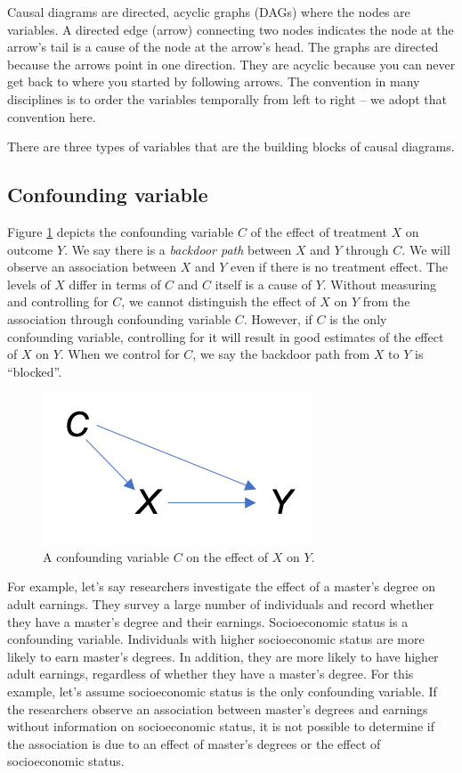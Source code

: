 \documentclass[
]{book}
\begin{document}
Causal diagrams are directed, acyclic graphs (DAGs) where the nodes are variables. A directed edge (arrow) connecting two nodes indicates the node at the arrow's tail is a cause of the node at the arrow's head. The graphs are directed because the arrows point in one direction. They are acyclic because you can never get back to where you started by following arrows. The convention in many disciplines is to order the variables temporally from left to right -- we adopt that convention here.

There are three types of variables that are the building blocks of causal diagrams.

\hypertarget{confounding-variable}{%
\subsection{Confounding variable}\label{confounding-variable}}

Figure \ref{fig:confounder} depicts the confounding variable \(C\) of the effect of treatment \(X\) on outcome \(Y\). We say there is a \emph{backdoor path} between \(X\) and \(Y\) through \(C\). We will observe an association between \(X\) and \(Y\) even if there is no treatment effect. The levels of \(X\) differ in terms of \(C\) and \(C\) itself is a cause of \(Y\). Without measuring and controlling for \(C\), we cannot distinguish the effect of \(X\) on \(Y\) from the association through confounding variable \(C\). However, if \(C\) is the only confounding variable, controlling for it will result in good estimates of the effect of \(X\) on \(Y\). When we control for \(C\), we say the backdoor path from \(X\) to \(Y\) is ``blocked''.

\begin{figure}
\centering
\includegraphics{./images/confounder.png}
\caption{\label{fig:confounder} A confounding variable \(C\) on the effect of \(X\) on \(Y\).}
\end{figure}

For example, let's say researchers investigate the effect of a master's degree on adult earnings. They survey a large number of individuals and record whether they have a master's degree and their earnings. Socioeconomic status is a confounding variable. Individuals with higher socioeconomic status are more likely to earn master's degrees. In addition, they are more likely to have higher adult earnings, regardless of whether they have a master's degree. For this example, let's assume socioeconomic status is the only confounding variable. If the researchers observe an association between master's degrees and earnings without information on socioeconomic status, it is not possible to determine if the association is due to an effect of master's degrees or the effect of socioeconomic status.
\end{document}
